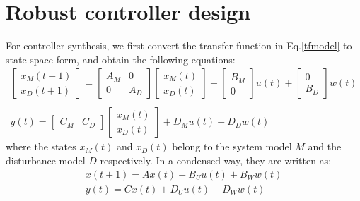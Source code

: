 \documentclass[letterpaper, 10 pt, conference]{ieeeconf}  %
\begin{document}
  \section{Robust controller design}
  For controller synthesis, we first
  convert the transfer function in Eq.\eqref{tfmodel} to state space form, and obtain the following equations:
  \begin{equation} 
  \begin{matrix}
  \begin{bmatrix}
  x_M(t+1) \\ x_D(t+1)
  \end{bmatrix} = 
  \begin{bmatrix}
  A_M & 0 \\ 0 & A_D
  \end{bmatrix}
  \begin{bmatrix}
  x_M(t) \\ x_D(t)
  \end{bmatrix} + 
  \begin{bmatrix}
  B_M \\ 0
  \end{bmatrix}
  u(t)+ 
  \begin{bmatrix}
  0 \\ B_D
  \end{bmatrix}
  w(t) \\ \\
  y(t) = 
  \begin{bmatrix}
  C_M & C_D
  \end{bmatrix}
  \begin{bmatrix}
  x_M(t) \\ x_D(t)
  \end{bmatrix}
  + D_Mu(t) + D_Dw(t) 
  \end{matrix}
  \label{ssmodel}
  \end{equation}
  where the states $x_M(t)$ and $x_D(t)$ belong to the system model $M$ and the disturbance model $D$ respectively. 
  In a condensed way, they are written as:
  \begin{equation}
  \begin{matrix}
    x(t+1)=Ax(t)+B_Uu(t)+B_Ww(t) \\
    y(t)=Cx(t)+D_Uu(t)+D_Ww(t) 
    \end{matrix} 
        \label{ssmodel_condensed}
    \end{equation}
\end{document}
